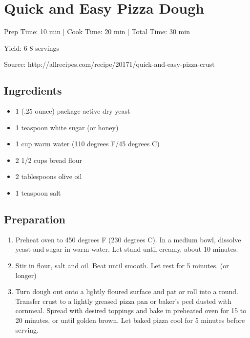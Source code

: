 \section{Quick and Easy Pizza Dough}

\begin{center}
Prep Time: 10 min | 
Cook Time: 20 min | 
Total Time: 30 min

\noindent Yield: 6-8 servings

\vspace{1em}

Source: http://allrecipes.com/recipe/20171/quick-and-easy-pizza-crust
\end{center}

\subsection{Ingredients}
\begin{multicols}{2}
\begin{itemize}
    \item 1 (.25 ounce) package active dry yeast
    \item 1 teaspoon white sugar (or honey)
    \item 1 cup warm water (110 degrees F/45 degrees C)
    \item 2 1/2 cups bread flour
    \item 2 tablespoons olive oil
    \item 1 teaspoon salt
\end{itemize}
\end{multicols}

\subsection{Preparation}
\begin{enumerate}
    \item Preheat oven to 450 degrees F (230 degrees C). In a medium bowl, dissolve yeast and sugar in warm water. Let stand until creamy, about 10 minutes.
    \item Stir in flour, salt and oil. Beat until smooth. Let rest for 5 minutes. (or longer)
    \item Turn dough out onto a lightly floured surface and pat or roll into a round. Transfer crust to a lightly greased pizza pan or baker's peel dusted with cornmeal. Spread with desired toppings and bake in preheated oven for 15 to 20 minutes, or until golden brown. Let baked pizza cool for 5 minutes before serving.
\end{enumerate}

